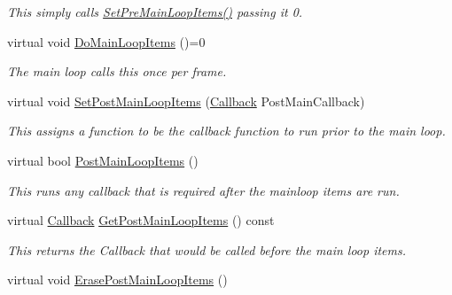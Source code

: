\begin{DoxyCompactItemize}
\begin{DoxyCompactList}\small\item\em This simply calls \hyperlink{classphys_1_1ManagerBase_a3fcf207a451d0047f884babadd0bc53e}{SetPreMainLoopItems()} passing it 0. \item\end{DoxyCompactList}\item 
virtual void \hyperlink{classphys_1_1ManagerBase_aa9e13a3f7c398b708f0f242610b5abf7}{DoMainLoopItems} ()=0
\begin{DoxyCompactList}\small\item\em The main loop calls this once per frame. \item\end{DoxyCompactList}\item 
virtual void \hyperlink{classphys_1_1ManagerBase_a673b3adef73c467f4d90514a5133bf7c}{SetPostMainLoopItems} (\hyperlink{classphys_1_1ManagerBase_a753f5f0127131529767beab2502f480b}{Callback} PostMainCallback)
\begin{DoxyCompactList}\small\item\em This assigns a function to be the callback function to run prior to the main loop. \item\end{DoxyCompactList}\item 
virtual bool \hyperlink{classphys_1_1ManagerBase_afc3572602f96bdeb8215c386ff870820}{PostMainLoopItems} ()
\begin{DoxyCompactList}\small\item\em This runs any callback that is required after the mainloop items are run. \item\end{DoxyCompactList}\item 
virtual \hyperlink{classphys_1_1ManagerBase_a753f5f0127131529767beab2502f480b}{Callback} \hyperlink{classphys_1_1ManagerBase_a1e541b261e5747ebcfcefdd3dcff78ce}{GetPostMainLoopItems} () const 
\begin{DoxyCompactList}\small\item\em This returns the Callback that would be called before the main loop items. \item\end{DoxyCompactList}\item 
\hypertarget{classphys_1_1ManagerBase_a9306dafe9ffe52916b84cf157fbc12d8}{
virtual void \hyperlink{classphys_1_1ManagerBase_a9306dafe9ffe52916b84cf157fbc12d8}{ErasePostMainLoopItems} ()}
\label{d2/de3/classphys_1_1ManagerBase_a9306dafe9ffe52916b84cf157fbc12d8}


\end{DoxyCompactItemize}
